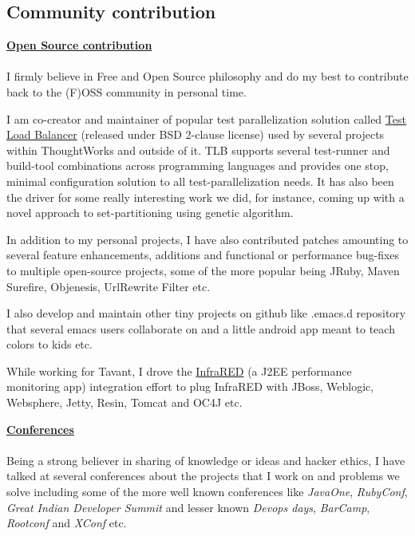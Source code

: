 \documentclass[margin,line]{res}
\begin{document}
\begin{resume}
\section{\sc Community contribution}
{\underline {\bf Open Source contribution}}\\
\vspace{-.2cm}\\
I firmly believe in Free and Open Source philosophy and do my best to contribute back to the (F)OSS community in personal time.

I am co-creator and maintainer of popular test parallelization solution called \href{http://test-load-balancer.github.com}{Test Load Balancer} (released under BSD 2-clause license) used by several projects within ThoughtWorks and outside of it. 
TLB supports several test-runner and build-tool combinations across programming languages and provides one stop, minimal configuration solution to all test-parallelization needs. 
It has also been the driver for some really interesting work we did, for instance, coming up with a novel approach to set-partitioning using genetic algorithm.

In addition to my personal projects, I have also contributed patches amounting to several feature enhancements, additions and functional or performance bug-fixes to multiple open-source projects, some of the more popular being JRuby, Maven Surefire, Objenesis, UrlRewrite Filter etc.

I also develop and maintain other tiny projects on github like .emacs.d repository that several emacs users collaborate on and a little android app meant to teach colors to kids etc.

While working for Tavant, I drove the \href{http://sourceforge.net/projects/infrared}{InfraRED} (a J2EE performance monitoring app) integration effort to plug InfraRED with JBoss, Weblogic, Websphere, Jetty, Resin, Tomcat and OC4J etc.

{\underline {\bf Conferences}}\\
\vspace{-.2cm}\\
Being a strong believer in sharing of knowledge or ideas and hacker ethics, I have talked at several conferences about the projects that I work on and problems we solve including some of the more well known conferences like {\em JavaOne}, {\em RubyConf}, {\em Great Indian Developer Summit} and lesser known {\em Devops days}, {\em BarCamp}, {\em Rootconf} and {\em XConf} etc.\\


\end{resume}
\end{document}
